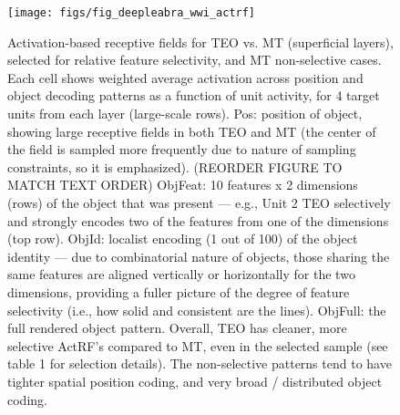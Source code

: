 \documentclass[11pt,twoside]{article}
\newif\myifpdf
\begin{document}
\begin{figure}
  \centering\texttt{[image: figs/fig\_deepleabra\_wwi\_actrf]}
  \caption{\footnotesize Activation-based receptive fields for TEO vs. MT (superficial layers), selected for relative feature selectivity, and MT non-selective cases.  Each cell shows weighted average activation across position and object decoding patterns as a function of unit activity, for 4 target units from each layer (large-scale rows).  Pos: position of object, showing large receptive fields in both TEO and MT (the center of the field is sampled more frequently due to nature of sampling constraints, so it is emphasized).  (REORDER FIGURE TO MATCH TEXT ORDER) ObjFeat: 10 features x 2 dimensions (rows) of the object that was present --- e.g., Unit 2 TEO selectively and strongly encodes two of the features from one of the dimensions (top row). ObjId: localist encoding (1 out of 100) of the object identity --- due to combinatorial nature of objects, those sharing the same features are aligned vertically or horizontally for the two dimensions, providing a fuller picture of the degree of feature selectivity (i.e., how solid and consistent are the lines).  ObjFull: the full rendered object pattern.  Overall, TEO has cleaner, more selective ActRF's compared to MT, even in the selected sample (see table 1 for selection details).  The non-selective patterns tend to have tighter spatial position coding, and very broad / distributed object coding.}
  \label{fig.actrf}
\end{figure}
\end{document}
